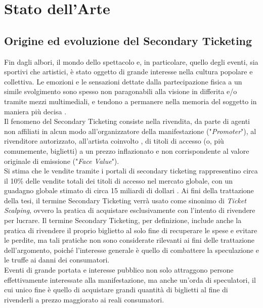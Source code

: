 \chapter{Stato dell'Arte}
\label{chap:stato_arte}

\section{Origine ed evoluzione del Secondary Ticketing} \label{sec:origin}
Fin dagli albori, il mondo dello spettacolo e, in particolare, quello degli eventi, sia sportivi che artistici, è stato oggetto di grande interesse nella cultura popolare e collettiva. Le emozioni e le sensazioni dettate dalla partecipazione fisica a un simile svolgimento sono spesso non paragonabili alla visione in differita e/o tramite mezzi multimediali, e tendono a permanere nella memoria del soggetto in maniera più decisa \cite{ballantyne2014designing}. \\ %
Il fenomeno del Secondary Ticketing consiste nella rivendita, da parte di agenti non affiliati in alcun modo all'organizzatore della manifestazione ("\textit{Promoter}"), al rivenditore autorizzato, all'artista coinvolto \cite{courty2003some}, di titoli di accesso (o, più comunemente, biglietti) a un prezzo inflazionato e non corrispondente al valore originale di emissione ("\textit{Face Value}"). \\ Si stima che le vendite tramite i portali di secondary ticketing rappresentino circa il 10\% delle vendite totali dei titoli di accesso nel mercato globale, con un guadagno globale stimato di circa 15 miliardi di dollari \cite{tompkins2018ticket}.
Ai fini della trattazione della tesi, il termine Secondary Ticketing verrà usato come sinonimo di \textit{Ticket Scalping}, ovvero la pratica di acquistare esclusivamente con l'intento di rivendere per lucrare. Il termine Secondary Ticketing, per definizione, include anche la pratica di rivendere il proprio biglietto al solo fine di recuperare le spese e evitare le perdite, ma tali pratiche non sono considerate rilevanti ai fini delle trattazione dell'argomento, poiché l'interesse generale è quello di combattere la speculazione e le truffe ai danni dei consumatori. \\
Eventi di grande portata e interesse pubblico non solo attraggono persone effettivamente interessate alla manifestazione, ma anche un'orda di speculatori, il cui unico fine è quello di acquistare grandi quantità di biglietti al fine di rivenderli a prezzo maggiorato ai reali consumatori. 
